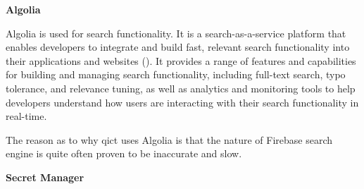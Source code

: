 \begin{multicols}{2}

      \textbf{Algolia}

      Algolia is used for search functionality. It is a search-as-a-service platform that enables developers to
      integrate and build fast, relevant search functionality into their applications and websites (\cite{algolia}).
      It provides a range of features and capabilities for building and managing search functionality, including
      full-text search, typo tolerance, and relevance tuning, as well as analytics and monitoring tools to help
      developers understand how users are interacting with their search functionality in real-time.

      The reason as to why \acrshort{qict} uses Algolia is that the nature of Firebase search engine is quite often
      proven to be inaccurate and slow.

      \textbf{Secret Manager}


\end{multicols}
